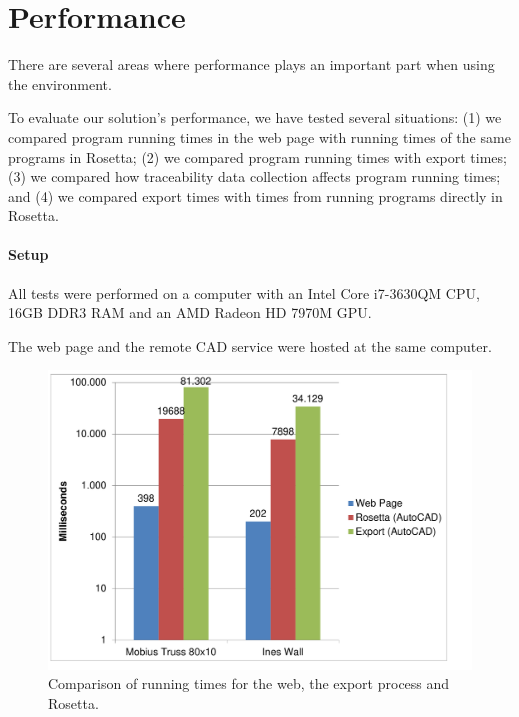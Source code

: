 \section{Performance}
\label{sec:eval:performance}
There are several areas where performance plays an important part when using the environment.

To evaluate our solution's performance, we have tested several situations: (1) we compared program running times in the web page with running times of the same programs in Rosetta; (2) we compared program running times with export times; (3) we compared how traceability data collection affects program running times; and (4) we compared export times with times from running programs directly in Rosetta.

\paragraph{Setup}
All tests were performed on a computer with an Intel Core i7-3630QM CPU, 16GB DDR3 RAM and an AMD Radeon HD 7970M GPU.

The web page and the remote CAD service were hosted at the same computer.


\begin{figure}
  \centering
  \includegraphics[width=12cm]{./images/run_export_rosetta_times}
  \caption{Comparison of running times for the web, the export process and Rosetta.}
  \label{fig:run:export:rosetta:chart}
\end{figure}



